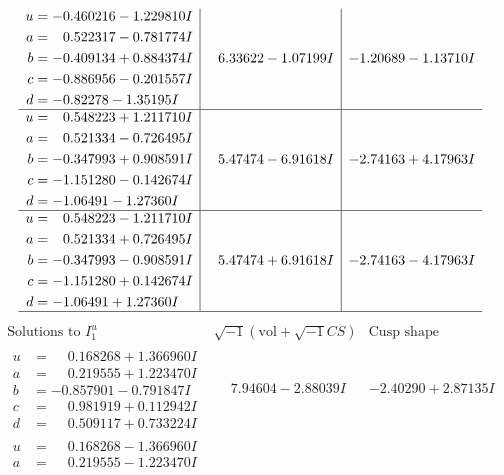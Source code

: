 \documentclass[1p]{elsarticle_modified}
\theoremstyle{definition}
\newcommand{\I}{\sqrt{-1}}
\begin{document}
$$\begin{array}{c|c|c}
\begin{aligned}
u &= -0.460216 - 1.229810 I \\
a &= \phantom{-}0.522317 - 0.781774 I \\
b &= -0.409134 + 0.884374 I \\
c &= -0.886956 - 0.201557 I \\
d &= -0.82278 - 1.35195 I\end{aligned}
 & \phantom{-}6.33622 - 1.07199 I & -1.20689 - 1.13710 I \\ \hline\begin{aligned}
u &= \phantom{-}0.548223 + 1.211710 I \\
a &= \phantom{-}0.521334 - 0.726495 I \\
b &= -0.347993 + 0.908591 I \\
c &= -1.151280 - 0.142674 I \\
d &= -1.06491 - 1.27360 I\end{aligned}
 & \phantom{-}5.47474 - 6.91618 I & -2.74163 + 4.17963 I \\ \hline\begin{aligned}
u &= \phantom{-}0.548223 - 1.211710 I \\
a &= \phantom{-}0.521334 + 0.726495 I \\
b &= -0.347993 - 0.908591 I \\
c &= -1.151280 + 0.142674 I \\
d &= -1.06491 + 1.27360 I\end{aligned}
 & \phantom{-}5.47474 + 6.91618 I & -2.74163 - 4.17963 I\\
 \hline 
 \end{array}$$\newpage$$\begin{array}{c|c|c}  
\text{Solutions to }I^u_{1}& \I (\text{vol} + \sqrt{-1}CS) & \text{Cusp shape}\\
 \hline 
\begin{aligned}
u &= \phantom{-}0.168268 + 1.366960 I \\
a &= \phantom{-}0.219555 + 1.223470 I \\
b &= -0.857901 - 0.791847 I \\
c &= \phantom{-}0.981919 + 0.112942 I \\
d &= \phantom{-}0.509117 + 0.733224 I\end{aligned}
 & \phantom{-}7.94604 - 2.88039 I & -2.40290 + 2.87135 I \\ \hline\begin{aligned}
u &= \phantom{-}0.168268 - 1.366960 I \\
a &= \phantom{-}0.219555 - 1.223470 I \\

\end{aligned}
\end{array}$$
\end{document}
